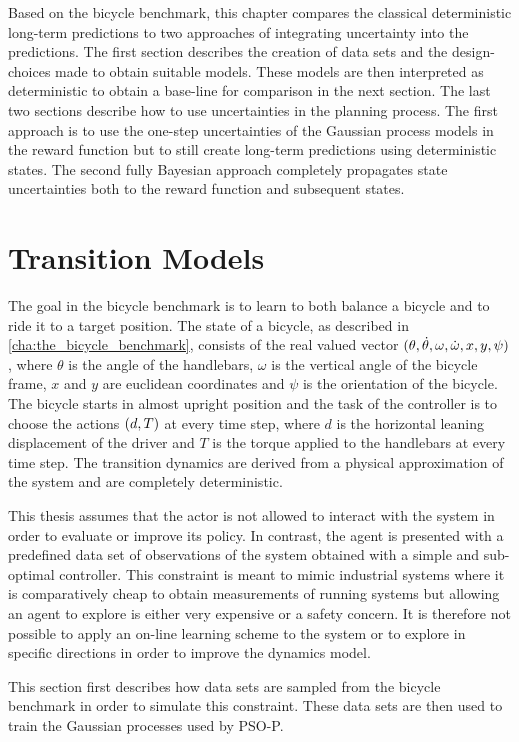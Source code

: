 Based on the bicycle benchmark, this chapter compares the classical deterministic long-term predictions to two approaches of integrating uncertainty into the predictions.
The first section describes the creation of data sets and the design-choices made to obtain suitable models.
These models are then interpreted as deterministic to obtain a base-line for comparison in the next section.
The last two sections describe how to use uncertainties in the planning process.
The first approach is to use the one-step uncertainties of the Gaussian process models in the reward function but to still create long-term predictions using deterministic states.
The second fully Bayesian approach completely propagates state uncertainties both to the reward function and subsequent states.

\section{Transition Models}
The goal in the bicycle benchmark is to learn to both balance a bicycle and to ride it to a target position.
The state of a bicycle, as described in \cref{cha:the_bicycle_benchmark}, consists of the real valued vector $(\theta, \dot{\theta}, \omega, \dot{\omega}, x, y, \psi)$, where $\theta$ is the angle of the handlebars, $\omega$ is the vertical angle of the bicycle frame, $x$ and $y$ are euclidean coordinates and $\psi$ is the orientation of the bicycle.
The bicycle starts in almost upright position and the task of the controller is to choose the actions $(d, T)$ at every time step, where $d$ is the horizontal leaning displacement of the driver and $T$ is the torque applied to the handlebars at every time step.
The transition dynamics are derived from a physical approximation of the system and are completely deterministic.

This thesis assumes that the actor is not allowed to interact with the system in order to evaluate or improve its policy.
In contrast, the agent is presented with a predefined data set of observations of the system obtained with a simple and sub-optimal controller.
This constraint is meant to mimic industrial systems where it is comparatively cheap to obtain measurements of running systems but allowing an agent to explore is either very expensive or a safety concern.
It is therefore not possible to apply an on-line learning scheme to the system or to explore in specific directions in order to improve the dynamics model.

This section first describes how data sets are sampled from the bicycle benchmark in order to simulate this constraint.
These data sets are then used to train the Gaussian processes used by PSO-P.

